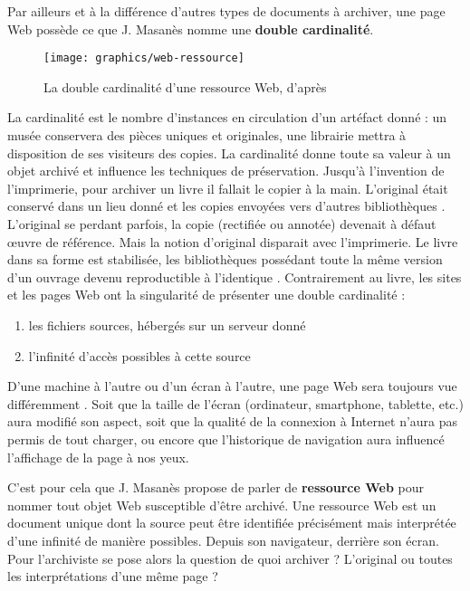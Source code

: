 \documentclass[symmetric,justified,marginals=raggedouter]{tufte-book}
\begin{document}
\noindent Par ailleurs et à la différence d'autres types de documents à archiver, une page Web possède ce que J. Masanès \citep[p.47]{masanes_web_2006} nomme une \textbf{double cardinalité}. 

\begin{figure}
  \texttt{[image: graphics/web-ressource]}
  \caption{La double cardinalité d'une ressource Web, d'après \citep{masanes_web_2006}}
  \label{fig:web-ressource}
\end{figure} 

\noindent La cardinalité est le nombre d'instances en circulation d'un artéfact donné : un musée conservera des pièces uniques et originales, une librairie mettra à disposition de ses visiteurs des copies. La cardinalité donne toute sa valeur à un objet archivé et influence les techniques de préservation. Jusqu'à l'invention de l'imprimerie, pour archiver un livre il fallait le copier à la main. L'original était conservé dans un lieu donné et les copies envoyées vers d'autres bibliothèques \citep{canfora_vanished_1990}. L'original se perdant parfois, la copie (rectifiée ou annotée) devenait à défaut œuvre de référence. Mais la notion d'original disparait avec l'imprimerie. Le livre dans sa forme est stabilisée, les bibliothèques possédant toute la même version d'un ouvrage devenu reproductible à l'identique \citep{febvre_apparition_2013}. Contrairement au livre, les sites et les pages Web ont la singularité de présenter une double cardinalité : 

\begin{enumerate}[leftmargin=*]  
\item les fichiers sources, hébergés sur un serveur donné 
\item l'infinité d'accès possibles à cette source
\end{enumerate}

\noindent D'une machine à l'autre ou d'un écran à l'autre, une page Web sera toujours vue différemment \citep{bon_apres_2014}. Soit que la taille de l'écran (ordinateur, smartphone, tablette, etc.) aura modifié son aspect, soit que la qualité de la connexion à Internet n'aura pas permis de tout charger, ou encore que l'historique de navigation aura influencé l'affichage de la page à nos yeux. 

C'est pour cela que J. Masanès propose de parler de \textbf{ressource Web} \citep[p.48]{masanes_web_2006} pour nommer tout objet Web susceptible d'être archivé. Une ressource Web est un document unique dont la source peut être identifiée précisément mais interprétée d'une infinité de ma\-nière possibles. Depuis son navigateur, derrière son écran. Pour l'archiviste se pose alors la question de quoi archiver ? L'original ou toutes les interprétations d'une même page ? 
\end{document}
